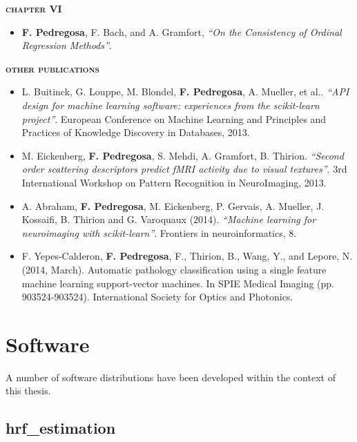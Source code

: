 \begin{fullwidth}
{\vspace{10pt}
{\bf \color{msblue} \textsc{chapter VI}}
\begin{itemize}
\item {\bf F. Pedregosa}, F. Bach, and A. Gramfort, \emph{``On the Consistency of Ordinal Regression Methods''}.
\end{itemize}

\vspace{10pt}
{\bf \color{msblue} \textsc{other publications}}
\begin{itemize}
\item L. Buitinck, G. Louppe, M. Blondel, {\bf F. Pedregosa}, A. Mueller, et al.. \emph{``API design for machine learning software: experiences from the scikit-learn project''}. European Conference on Machine Learning and Principles and Practices of Knowledge Discovery in Databases, 2013.

\item M. Eickenberg, {\bf F. Pedregosa}, S. Mehdi, A. Gramfort, B. Thirion. \emph{``Second order scattering descriptors predict fMRI activity due to visual textures''}. 3rd International Workshop on Pattern Recognition in NeuroImaging, 2013. 

\item A. Abraham, {\bf F. Pedregosa}, M. Eickenberg, P. Gervais, A. Mueller, J. Kossaifi,  B. Thirion and G. Varoquaux (2014). \emph{``Machine learning for neuroimaging with scikit-learn''}. Frontiers in neuroinformatics, 8.

\item F. Yepes-Calderon, {\bf F. Pedregosa}, F., Thirion, B., Wang, Y., and Lepore, N. (2014, March). Automatic pathology classification using a single feature machine learning support-vector machines. In SPIE Medical Imaging (pp. 903524-903524). International Society for Optics and Photonics.
\end{itemize}
}
\end{fullwidth}
\vspace*{\fill}


\newpage

\section{Software}

A number of software distributions have been developed within the context of this thesis.

\subsection{hrf\_estimation}\label{subsec:hrf_estimation}

